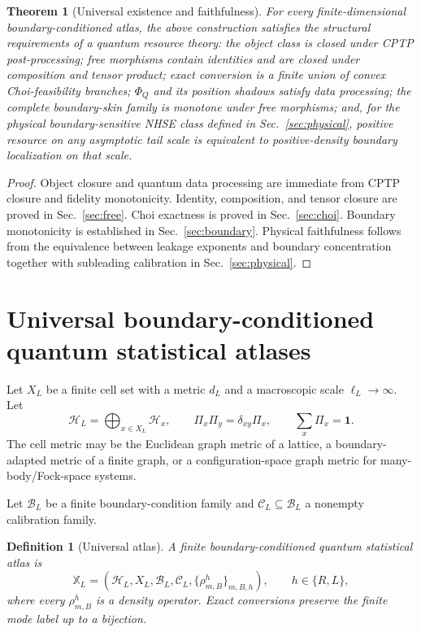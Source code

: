 \documentclass[11pt]{article}
\newtheorem{definition}{Definition}
\newtheorem{theorem}{Theorem}
\newcommand{\id}{\mathbf 1}
\newcommand{\calB}{\mathcal B}
\newcommand{\calC}{\mathcal C}
\newcommand{\HH}{\mathcal H}
\begin{document}
\begin{theorem}[Universal existence and faithfulness]
For every finite-dimensional boundary-conditioned atlas, the above construction satisfies the structural requirements of a quantum resource theory: the object class is closed under CPTP post-processing; free morphisms contain identities and are closed under composition and tensor product; exact conversion is a finite union of convex Choi-feasibility branches; $\Phi_Q$ and its position shadows satisfy data processing; the complete boundary-skin family is monotone under free morphisms; and, for the physical boundary-sensitive NHSE class defined in Sec.~\ref{sec:physical}, positive resource on any asymptotic tail scale is equivalent to positive-density boundary localization on that scale.
\end{theorem}

\begin{proof}
Object closure and quantum data processing are immediate from CPTP closure and fidelity monotonicity. Identity, composition, and tensor closure are proved in Sec.~\ref{sec:free}. Choi exactness is proved in Sec.~\ref{sec:choi}. Boundary monotonicity is established in Sec.~\ref{sec:boundary}. Physical faithfulness follows from the equivalence between leakage exponents and boundary concentration together with subleading calibration in Sec.~\ref{sec:physical}.
\end{proof}

\section{Universal boundary-conditioned quantum statistical atlases}

Let $X_L$ be a finite cell set with a metric $d_L$ and a macroscopic scale $\ell_L\to\infty$. Let
\[
\HH_L=\bigoplus_{x\in X_L}\HH_x,
\qquad
\Pi_x\Pi_y=\delta_{xy}\Pi_x,
\qquad
\sum_x\Pi_x=\id.
\]
The cell metric may be the Euclidean graph metric of a lattice, a boundary-adapted metric of a finite graph, or a configuration-space graph metric for many-body/Fock-space systems.

Let $\calB_L$ be a finite boundary-condition family and $\calC_L\subseteq\calB_L$ a nonempty calibration family.

\begin{definition}[Universal atlas]
A finite boundary-conditioned quantum statistical atlas is
\[
\mathbb X_L=
(\HH_L,X_L,\calB_L,\calC_L,
\{\rho_{m,B}^{h}\}_{m,B,h}),
\qquad h\in\{R,L\},
\]
where every $\rho_{m,B}^h$ is a density operator. Exact conversions preserve the finite mode label up to a bijection.
\end{definition}
\end{document}
